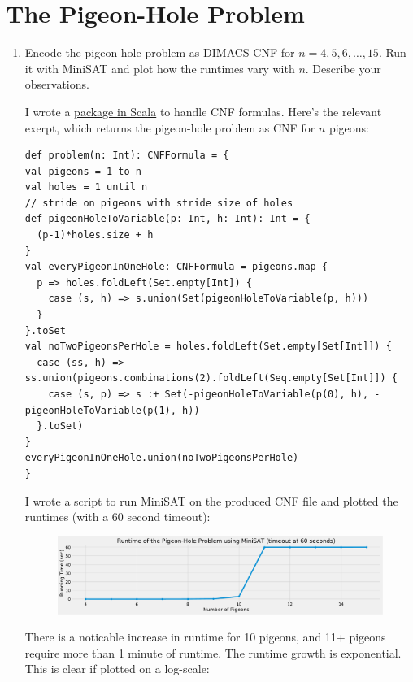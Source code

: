 \section{The Pigeon-Hole Problem}
\begin{enumerate}[label=(\alph*)]
    \item {\color{blue} Encode the pigeon-hole problem as DIMACS CNF for $n = 4, 5, 6, \dots, 15$. Run it with MiniSAT and plot how the runtimes vary with $n$. Describe your observations.}

    I wrote a \href{https://github.com/vighneshiyer/ee219c-formal/blob/master/formal-toolkit/src/main/scala/formal/PigeonHoleProblem.scala}{package in Scala} to handle CNF formulas. Here's the relevant exerpt, which returns the pigeon-hole problem as CNF for $n$ pigeons:

        \begin{verbatim}
def problem(n: Int): CNFFormula = {
val pigeons = 1 to n
val holes = 1 until n
// stride on pigeons with stride size of holes
def pigeonHoleToVariable(p: Int, h: Int): Int = {
  (p-1)*holes.size + h
}
val everyPigeonInOneHole: CNFFormula = pigeons.map {
  p => holes.foldLeft(Set.empty[Int]) {
    case (s, h) => s.union(Set(pigeonHoleToVariable(p, h)))
  }
}.toSet
val noTwoPigeonsPerHole = holes.foldLeft(Set.empty[Set[Int]]) {
  case (ss, h) => ss.union(pigeons.combinations(2).foldLeft(Seq.empty[Set[Int]]) {
    case (s, p) => s :+ Set(-pigeonHoleToVariable(p(0), h), -pigeonHoleToVariable(p(1), h))
  }.toSet)
}
everyPigeonInOneHole.union(noTwoPigeonsPerHole)
}
        \end{verbatim}

        I wrote a script to run MiniSAT on the produced CNF file and plotted the runtimes (with a 60 second timeout):

        \begin{figure}[H]
          \centering
          \includegraphics[width=\textwidth]{figs/pigeon_hole_runtime.pdf}
        \end{figure}

        There is a noticable increase in runtime for 10 pigeons, and 11+ pigeons require more than 1 minute of runtime. The runtime growth is exponential. This is clear if plotted on a log-scale:


\end{enumerate}
